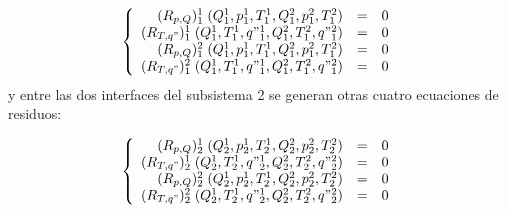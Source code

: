 \begin{equation}
\left\{ \begin{array}{rcl}
(R_{p,Q})_{1}^{1}  \;(Q_1^1, p_1^1, T_1^1, Q_1^2, p_1^2, T_1^2) &=& 0 \\
(R_{T,q"})_{1}^{1} \;(Q_1^1, T_1^1, q"_1^1, Q_1^2, T_1^2, q"_1^2) &=& 0 \\
(R_{p,Q})_{1}^{2}  \;(Q_1^1, p_1^1, T_1^1, Q_1^2, p_1^2, T_1^2) &=& 0 \\
(R_{T,q"})_{1}^{2} \;(Q_1^1, T_1^1, q"_1^1, Q_1^2, T_1^2, q"_1^2) &=& 0 
\end{array}
\right.
\label{residuos-1}
\end{equation}
y entre las dos interfaces del subsistema 2 se generan otras cuatro ecuaciones de residuos:

\begin{equation}
\left\{ \begin{array}{rcl}
(R_{p,Q})_{2}^{1}  \;(Q_2^1, p_2^1, T_2^1, Q_2^2, p_2^2, T_2^2) &=& 0 \\
(R_{T,q"})_{2}^{1} \;(Q_2^1, T_2^1, q"_2^1, Q_2^2, T_2^2, q"_2^2) &=& 0 \\
(R_{p,Q})_{2}^{2}  \;(Q_2^1, p_2^1, T_2^1, Q_2^2, p_2^2, T_2^2) &=& 0 \\
(R_{T,q"})_{2}^{2} \;(Q_2^1, T_2^1, q"_2^1, Q_2^2, T_2^2, q"_2^2) &=& 0
\end{array}
\right.
\label{residuos-2}
\end{equation}

